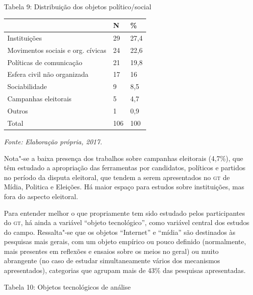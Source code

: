 \begin{center}
Tabela 9: Distribuição dos objetos político/social
\end{center}

\begin{center}
\centering
\begin{tabular}{|l|l|l|}
\hline
 & \textbf{N} & \textbf{\%} \\ \hline
Instituições & 29 & 27,4 \\ \hline
Movimentos sociais e org. cívicas & 24 & 22,6 \\ \hline
Políticas de comunicação & 21 & 19,8 \\ \hline
Esfera civil não organizada & 17 & 16 \\ \hline
Sociabilidade & 9 & 8,5 \\ \hline
Campanhas eleitorais & 5 & 4,7 \\ \hline
Outros & 1 & 0,9 \\ \hline
Total & 106 & 100 \\ \hline
\end{tabular}
\end{center}

\begin{center}
{\footnotesize\emph{Fonte: Elaboração própria, 2017.}}
\end{center}

Nota"-se a baixa presença dos trabalhos sobre campanhas eleitorais
(4,7\%), que têm estudado a apropriação das ferramentas por candidatos,
políticos e partidos no período da disputa eleitoral, que tendem a serem
apresentados no \textsc{gt} de Mídia, Politica e Eleições. Há maior espaço para
estudos sobre instituições, mas fora do aspecto eleitoral.

Para entender melhor o que propriamente tem sido estudado pelos
participantes do \textsc{gt}, há ainda a variável ``objeto tecnológico'', como
variável central dos estudos do campo. Ressalta"-se que os objetos
``Internet'' e ``mídia'' são destinados às pesquisas mais gerais, com um
objeto empírico ou pouco definido (normalmente, mais presentes em
reflexões e ensaios sobre os meios no geral) ou muito abrangente (no
caso de estudar simultaneamente vários dos mecanismos apresentados),
categorias que agrupam mais de 43\% das pesquisas apresentadas.

\begin{center}
Tabela 10: Objetos tecnológicos de análise
\end{center}

